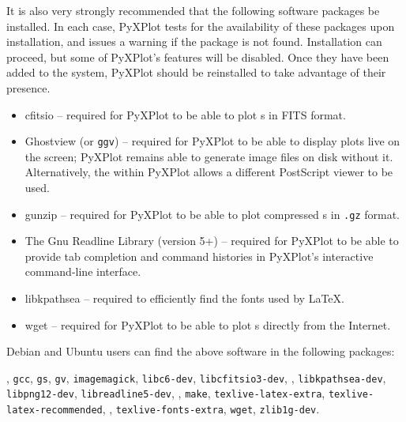 \noindent It is also very strongly recommended that the following software
packages be installed. In each case, PyXPlot tests for the availability of
these packages upon installation, and issues a warning if the package is not
found. Installation can proceed, but some of PyXPlot's features will be
disabled. Once they have been added to the system, PyXPlot should be
reinstalled to take advantage of their presence.

\vspace{0.5cm}
\begin{itemize}
\item cfitsio -- required for PyXPlot to be able to plot \datafile s in FITS format.
\item Ghostview  (or {\tt ggv}) -- required for PyXPlot to be able to display plots live on the screen; PyXPlot remains able to generate image files on disk without it. Alternatively, the  within PyXPlot allows a different PostScript viewer to be used.
\item gunzip  -- required for PyXPlot to be able to plot compressed \datafile s in {\tt .gz} format.
\item The Gnu Readline Library (version 5+)  -- required for PyXPlot to be able to provide tab completion and command histories in PyXPlot's interactive command-line interface.
\item libkpathsea  -- required to efficiently find the fonts used by \LaTeX.
\item wget  -- required for PyXPlot to be able to plot \datafile s directly from the Internet.
\end{itemize}
\vspace{0.5cm}

Debian and Ubuntu users can find the above software in the following packages:

\vspace{2mm}
, {\tt gcc}, {\tt gs}, {\tt gv}, {\tt imagemagick}, {\tt libc6-dev}, {\tt libcfitsio3-dev},\newline
{}, {\tt libkpathsea-dev}, {\tt libpng12-dev}, {\tt libreadline5-dev},\newline
{}, {\tt make}, {\tt texlive-latex-extra}, {\tt texlive-latex-recommended},\newline
{}, {\tt texlive-fonts-extra}, {\tt wget}, {\tt zlib1g-dev}.
\vspace{2mm}

